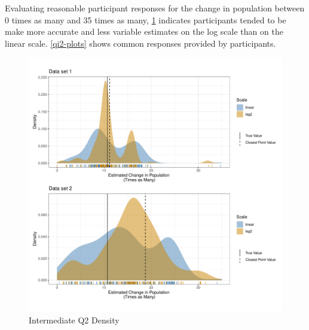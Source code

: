 \documentclass[print]{nuthesis}
\begin{document}
Evaluating reasonable participant responses for the change in population between 0 times as many and 35 times as many, \cref{fig:qi2-density} indicates participants tended to be make more accurate and less variable estimates on the log scale than on the linear scale.
\cref{qi2-plots} shows common responses provided by participants.

\begin{figure}[tbp]

{\centering \includegraphics[width=1\linewidth,]{thesis_files/figure-latex/qi2-density-1} 

}

\caption{Intermediate Q2 Density}\label{fig:qi2-density}
\end{figure}
\end{document}
